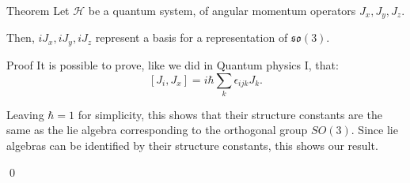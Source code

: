 \documentclass[a4paper]{article}
\begin{document}
\begin{parag}{Theorem}
    Let $\mathcal{H}$ be a quantum system, of angular momentum operators $J_x, J_y, J_z$.

    Then, $i J_x, i J_y, i J_z$ represent a basis for a representation of $\mathfrak{so}\left(3\right)$.

    \begin{subparag}{Proof}
        It is possible to prove, like we did in Quantum physics I, that: 
        \[\left[J_i, J_x\right] = i \hbar \sum_{k} \epsilon_{ijk} J_k.\]

        Leaving $\hbar = 1$ for simplicity, this shows that their structure constants are the same as the lie algebra corresponding to the orthogonal group $SO\left(3\right)$. Since lie algebras can be identified by their structure constants, this shows our result.

        \qed
    \end{subparag}
\end{parag}
\end{document}
